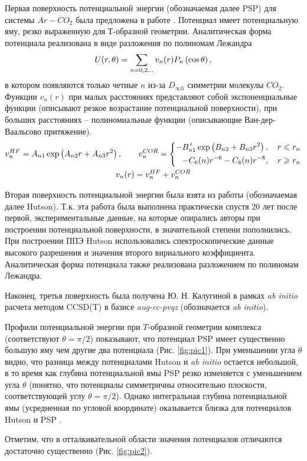 Первая поверхность потенциальной энергии (обозначаемая далее PSP) для системы $Ar-CO_2$ была предложена в работе \cite{parker1976}. Потенциал имеет потенциальную яму, резко выраженную для Т-образной геометрии. Аналитическая форма потенциала реализована в виде разложения по полиномам Лежандра
\vverh
\begin{gather}
	U(r, \theta) = \sum_{n = 0, 2 \dots} v_n(r) P_n \left( \cos \theta \right), \notag
\end{gather}
в котором появляются только четные $n$ из-за $D_{\infty h}$ симметрии молекулы $CO_2$. Функции $v_n(r)$ при малых расстояниях представляют собой экспоненциальные функции (описывают резкое возрастание потенциальной поверхности), при больших расстояниях -- полиномиальные функции (описывающие Ван-дер-Ваальсово притяжение). 
\vverh
\begin{gather}
	v_n^{HF} = A_{n1} \exp \left( A_{n2} r + A_{n3} r^2 \right), \notag \quad \quad 
	v_n^{COR} = \left\{
	\begin{aligned}
		- B_{n1}^{\, \prime} \exp \left( B_{n2} + B_{n3} r^2 \right), \quad r \leqslant r_n \\
		-C_6(n) r^{-6} - C_8(n) r^{-8}, \quad r \geqslant r_n
	\end{aligned} \right. \notag \\
	v_n(r) = v_n^{HF} + v_n^{COR} \notag 
\end{gather}

Вторая поверхность потенциальной энергии была взята из работы \cite{hutson1996} (обозначаемая далее Hutson). Т.к. эта работа была выполнена практически спустя 20 лет после первой, экспериментальные данные, на которые опирались авторы при построении потенциальной поверхности, в значительной степени пополнились. При построении ППЭ Hutson использовались спектроскопические данные высокого разрешения и значения второго вириального коэффициента. Аналитическая форма потенциала также реализована разложением по полиномам Лежандра.  

Наконец, третья поверхность была получена Ю. Н. Калугиной в рамках \textit{ab initio} расчета методом CCSD(T) в базисе \textit{aug-cc-pvqz} \cite{kalugina2017} (обозначается \textit{ab initio}).

Профили потенциальной энергии при $T$-образной геометрии комплекса (соответствуют $\theta = \pi / 2$) показывают, что потенциал PSP имеет существенно большую яму чем другие два потенциала (Рис. \ref{fig:pic1}). При уменьшении угла $\theta$ видно, что разница между потенциалами Hutson и \textit{ab initio} остается небольшой, в то время как глубина потенциальной ямы PSP резко изменяется с уменьшением угла $\theta$ (понятно, что потенциалы симметричны относительно плоскости, соответствующей углу $\theta = \pi / 2$). Однако интегральная глубина потенциальной ямы (усредненная по угловой координате) оказывается близка для потенциалов Hutson и PSP \cite{hutson1996}. \par
Отметим, что в отталкивательной области значения потенциалов отличаются достаточно существенно (Рис. \ref{fig:pic2}).

